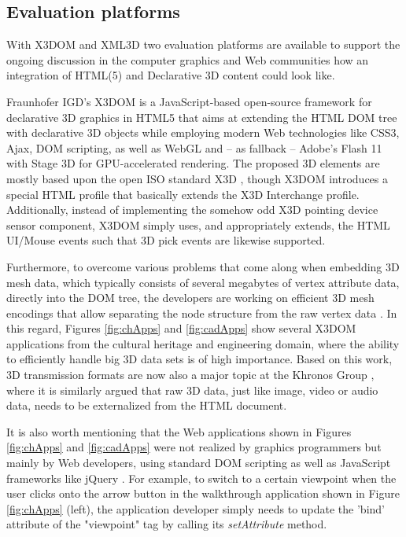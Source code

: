 \documentclass{acmsiggraph}
\begin{document}
\subsection{Evaluation platforms}
\label{subsection:evaluation}

With X3DOM \cite{Behr2009} and XML3D \cite{Sons2010} two evaluation platforms are available to support the ongoing discussion in the computer graphics and Web communities how an integration of HTML(5) and Declarative 3D content could look like. 

Fraunhofer IGD's X3DOM \cite{Behr2009,Behr12} is a JavaScript-based open-source framework for declarative 3D graphics in HTML5 that aims at extending the HTML DOM tree with declarative 3D objects while employing modern Web technologies like CSS3, Ajax, DOM scripting, as well as WebGL and -- as fallback -- Adobe's Flash 11 with Stage 3D \cite{flash} for GPU-accelerated rendering. The proposed 3D elements are mostly based upon the open ISO standard X3D \cite{Web3D-X3D}, though X3DOM introduces a special HTML profile that basically extends the X3D Interchange profile. Additionally, instead of implementing the somehow odd X3D pointing device sensor component, X3DOM simply uses, and appropriately extends, the HTML UI/Mouse events such that 3D pick events are likewise supported.

Furthermore, to overcome various problems that come along when embedding 3D mesh data, which typically consists of several megabytes of vertex attribute data, directly into the DOM tree, the developers are working on efficient 3D mesh encodings that allow separating the node structure from the raw vertex data \cite{Behr12}. In this regard, Figures \ref{fig:chApps} and \ref{fig:cadApps} show several X3DOM applications from the cultural heritage and engineering domain, where the ability to efficiently handle big 3D data sets is of high importance.
Based on this work, 3D transmission formats are now also a major topic at the Khronos Group \cite{Trevett12}, where it is similarly argued that raw 3D data, just like image, video or audio data, needs to be externalized from the HTML document.

It is also worth mentioning that the Web applications shown in Figures \ref{fig:chApps} and \ref{fig:cadApps} were not realized by graphics programmers but mainly by Web developers, using standard DOM scripting as well as JavaScript frameworks like jQuery \cite{jquery}. For example, to switch to a certain viewpoint when the user clicks onto the arrow button in the walkthrough application shown in Figure \ref{fig:chApps} (left), the application developer simply needs to update the 'bind' attribute of the "viewpoint" tag by calling its \emph{setAttribute} method.
\end{document}

